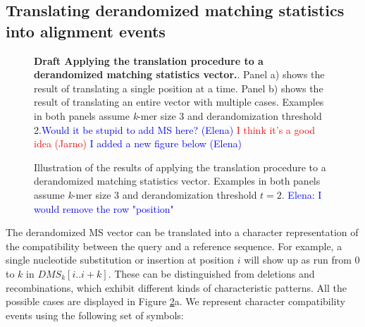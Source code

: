 \documentclass[unnumsec,webpdf,contemporary,large]{oup-authoring-template}%
\theoremstyle{thmstyleone}%
\theoremstyle{thmstyletwo}%
\theoremstyle{thmstylethree}%
\begin{document}
\subsection{Translating derandomized matching statistics into alignment events}

\begin{figure}[!b]%
\centering
{}
\caption{\textbf{Draft Applying the translation procedure to a derandomized matching statistics vector.}. Panel a) shows the result of translating a single position at a time. Panel b) shows the result of translating an entire vector with multiple cases. Examples in both panels assume \emph{k}-mer size 3 and derandomization threshold 2.\textcolor{blue}{Would it be stupid to add MS here? (Elena)} \textcolor{red}{I think it's a good idea (Jarno)} \textcolor{blue}{I added a new figure below (Elena)} }\label{fig2}
\end{figure}

\begin{figure}[h!]
\small
    \centering
    
    \vspace{.5em} %
    
    \caption{Illustration of the results of applying the translation procedure to a derandomized matching statistics vector. Examples in both panels assume \emph{k}-mer size 3 and derandomization threshold $t=2$. \textcolor{blue}{Elena: I would remove the row "position"}}
    \label{fig:translate_cases}
\end{figure}



The derandomized MS vector can be translated into a character representation of the compatibility between the query and a reference sequence. For example, a single nucleotide substitution or insertion at position $i$ will show up as run from 0 to $k$ in $DMS_k[i..i+k]$. These can be distinguished from deletions and recombinations, which exhibit different kinds of characteristic patterns. All the possible cases are displayed in Figure \ref{fig:translate_cases}a. We represent character compatibility events using the following set of symbols:
\end{document}
